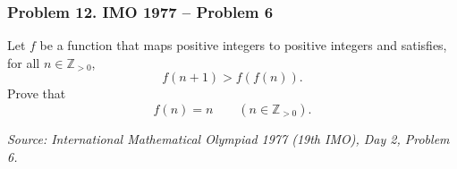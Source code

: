 \subsubsection*{Problem 12. IMO 1977 -- Problem 6}

\begin{exercisebox}[medium]

Let $f$ be a function that maps positive integers to positive integers
and satisfies, for all $n\in\mathbb Z_{>0}$,
\[
f(n+1)>f(f(n)).
\]
Prove that
\[
f(n)=n\qquad(n\in\mathbb Z_{>0}).
\]

\medskip
\noindent
\textit{Source: International Mathematical Olympiad 1977 (19th IMO),
Day 2, Problem 6.}


\end{exercisebox}